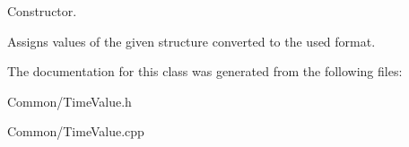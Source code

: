 Constructor. 

Assigns values of the given structure converted to the used format. 

The documentation for this class was generated from the following files\-:\begin{DoxyCompactItemize}
\item 
Common/Time\-Value.\-h\item 
Common/Time\-Value.\-cpp\end{DoxyCompactItemize}
